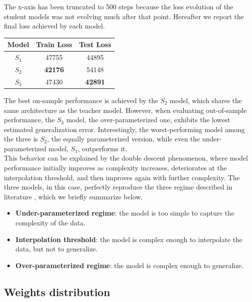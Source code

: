 The x-axis has been truncated to 500 steps because the loss evolution of the
student models was not evolving much after that point. Hereafter we report the final
loss achieved by each model.

\begin{table}[H]
    \centering
    \begin{tabular}{c|cc}
        \toprule
        \textbf{Model} & Train Loss & Test Loss \\
        \midrule
        $S_1$ & 47755 & 44895 \\
        $S_2$ & \textbf{42176} & 54148 \\
        $S_3$ & 47430 & \textbf{42891} \\
        \bottomrule
    \end{tabular}
\end{table}

The best on-sample performance is achieved by the $S_2$ model,
which shares the same architecture as the teacher model. However,
when evaluating out-of-sample performance, the $S_3$ model, the over-parameterized 
one, exhibits the lowest estimated generalization error. Interestingly,
the worst-performing model among the three is $S_2$, the equally parameterized version,
while even the under-parameterized model, $S_1$, outperforms it. \\

This behavior can be explained by the double descent phenomenon,
where model performance initially improves as complexity increases,
deteriorates at the interpolation threshold, and then improves again
with further complexity. The three models, in this case, perfectly 
reproduce the three regime described in literature
\cite{belkin2019biasvariance} \cite{nakkiran2019deepdoubledescent} \cite{lafon2024doubledescent}
, which we briefly summarize below.
\begin{itemize}
    \item \textbf{Under-parameterized regime}: the model is too simple to capture the complexity of the data.
    \item \textbf{Interpolation threshold}: the model is complex enough to interpolate the data, but not to generalize.
    \item \textbf{Over-parameterized regime}: the model is complex enough to generalize.
\end{itemize}


\subsection{Weights distribution}

